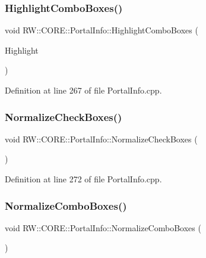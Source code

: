 \subsubsection{\texorpdfstring{Highlight\+Combo\+Boxes()}{HighlightComboBoxes()}}
{\footnotesize\ttfamily void R\+W\+::\+C\+O\+R\+E\+::\+Portal\+Info\+::\+Highlight\+Combo\+Boxes (\begin{DoxyParamCaption}\item[{Q\+Label $\ast$}]{Highlight }\end{DoxyParamCaption})\hspace{0.3cm}{\ttfamily [private]}}



Definition at line 267 of file Portal\+Info.\+cpp.

\hypertarget{class_r_w_1_1_c_o_r_e_1_1_portal_info_a76776e5e5e56da7ff882748881a89b65}{}\label{class_r_w_1_1_c_o_r_e_1_1_portal_info_a76776e5e5e56da7ff882748881a89b65} 
\subsubsection{\texorpdfstring{Normalize\+Check\+Boxes()}{NormalizeCheckBoxes()}}
{\footnotesize\ttfamily void R\+W\+::\+C\+O\+R\+E\+::\+Portal\+Info\+::\+Normalize\+Check\+Boxes (\begin{DoxyParamCaption}{ }\end{DoxyParamCaption})\hspace{0.3cm}{\ttfamily [private]}}



Definition at line 272 of file Portal\+Info.\+cpp.

\hypertarget{class_r_w_1_1_c_o_r_e_1_1_portal_info_a6d1f3e606e52aa278cadeb7ae8846887}{}\label{class_r_w_1_1_c_o_r_e_1_1_portal_info_a6d1f3e606e52aa278cadeb7ae8846887} 
\subsubsection{\texorpdfstring{Normalize\+Combo\+Boxes()}{NormalizeComboBoxes()}}
{\footnotesize\ttfamily void R\+W\+::\+C\+O\+R\+E\+::\+Portal\+Info\+::\+Normalize\+Combo\+Boxes (\begin{DoxyParamCaption}{ }\end{DoxyParamCaption})\hspace{0.3cm}{\ttfamily [private]}}



